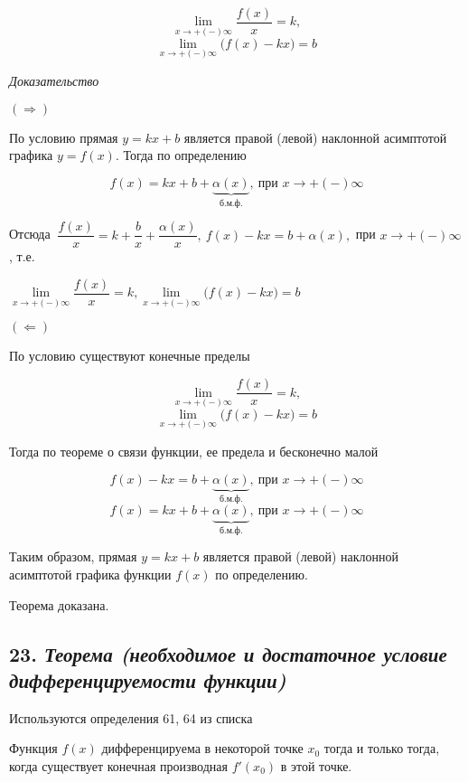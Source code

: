$$\lim\limits_{x \to +(-)\infty}{\dfrac{f(x)}{x}} = k,$$ $$\lim\limits_{x \to +(-)\infty}{\big(f(x) - kx\big)} = b$$
\vspace*{20pt} 

\textit{Доказательство}

$(\Rightarrow)$

По условию прямая $y = kx + b$ является правой (левой) наклонной асимптотой графика $y = f(x)$. Тогда по определению

$$
f(x) = kx+b+\underbrace{\alpha(x)}_{\text{б.м.ф.}},\ \text{при } x \rightarrow +(-)\infty
$$

Отсюда $\ {\dfrac{f(x)}{x}} = k + {\dfrac{b}{x}} + {\dfrac{\alpha(x)}{x}}, \ f(x) - kx = b + \alpha(x), $ при $x \rightarrow +(-)\infty$, т.е.

$\lim\limits_{x \to +(-)\infty}{\dfrac{f(x)}{x}} = k,  \lim\limits_{x \to +(-)\infty}{\big(f(x) - kx\big)} = b$

$(\Leftarrow)$

По условию существуют конечные пределы

$$\lim\limits_{x \to +(-)\infty}{\dfrac{f(x)}{x}} = k,$$ $$\lim\limits_{x \to +(-)\infty}{\big(f(x) - kx\big)} = b$$

Тогда по теореме о связи функции, ее предела и бесконечно малой

$${f(x) - kx} = b + \underbrace{\alpha(x)}_{\text{б.м.ф.}},\ \text{при } x \rightarrow +(-)\infty$$ $${f(x)} = kx + b + \underbrace{\alpha(x)}_{\text{б.м.ф.}},\ \text{при } x \rightarrow +(-)\infty$$

Таким образом, прямая $y = kx + b$ является правой (левой) наклонной асимптотой графика функции $f(x)$ по определению.

Теорема доказана.
\newpage 
\subsection*{23. \textit{Теорема (необходимое и достаточное условие дифференцируемости функции)}}
\begin{Quote2} 
\small\centering 

Используются определения 61, 64 из списка \end{Quote2} 

Функция $f(x)$ дифференцируема в некоторой точке $x_0$ тогда и только тогда, когда существует конечная производная $f'(x_0)$ в этой точке.
\vspace*{20pt} 

